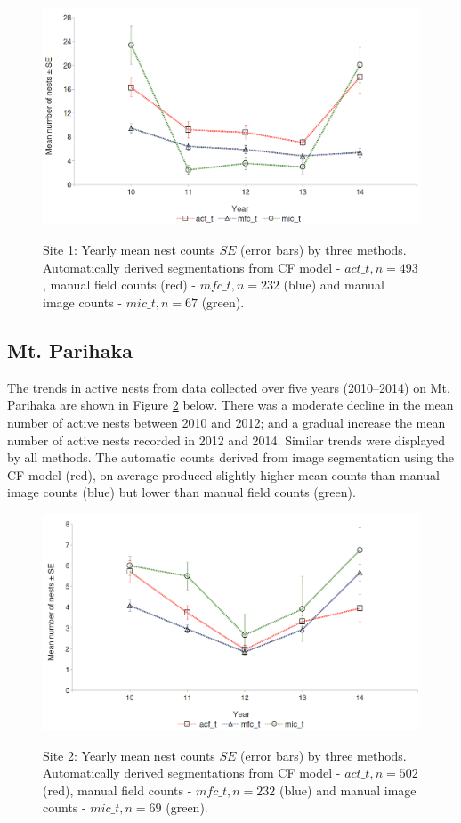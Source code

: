 \begin{figure}\myfloatalign
\includegraphics[width=0.9\linewidth]{gfx6/change/changebysite1} \\
\caption[Yearly nest counts site 1.]{Site 1:  Yearly mean  nest counts \textpm $ SE$ (error bars) by three methods. Automatically derived segmentations from CF model - $ act\_t, n = 493 $, manual field counts (red) - $ mfc\_t, n = 232 $ (blue) and manual image counts - $ mic\_t, n = 67 $ (green).}\label{fig:changebysite1}
\end{figure}

\subsection{Mt. Parihaka}\label{sec:mt.-parihaka}
The trends in active nests from data collected  over five years (2010--2014) on Mt. Parihaka are shown in Figure \ref{fig:changebysite2} below. There was a moderate decline in the mean number of active nests between 2010 and 2012; and a gradual increase the mean number of active nests recorded in 2012 and 2014. Similar trends were displayed by all methods. The automatic counts derived from image segmentation using the CF model (red), on average produced slightly higher mean counts than manual image counts (blue) but lower than manual field counts (green).

\begin{figure}\myfloatalign
\includegraphics[width=.9\linewidth]{gfx6/change/changebysite2} \\
\caption[Yearly nest counts site 2. ]{Site 2:  Yearly mean  nest counts  \textpm $SE$ (error bars) by three methods. Automatically derived segmentations from CF model - $ act\_t, n = 502 $ (red), manual field counts - $ mfc\_t, n = 232 $ (blue) and manual image counts - $ mic\_t, n = 69 $ (green).}\label{fig:changebysite2}
\end{figure}

